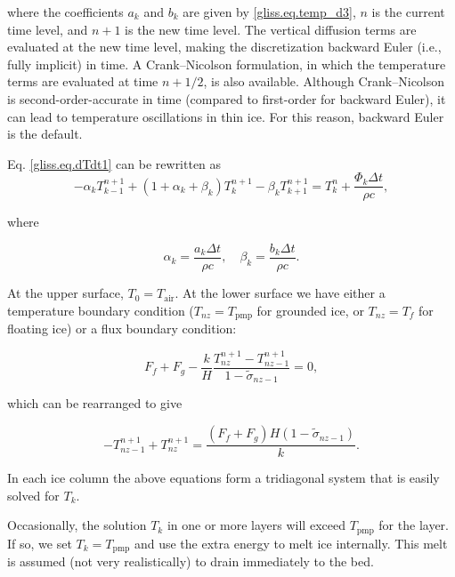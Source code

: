 \noindent
where the coefficients $a_k$ and $b_k$ are given by \eqref{gliss.eq.temp_d3}, $n$ is the current time level,
and $n+1$ is the new time level.  The vertical diffusion terms are evaluated at the new time level,
making the discretization backward Euler (i.e., fully implicit) in time.  A Crank--Nicolson formulation, in which the temperature
terms are evaluated at time $n+1/2$, is also available.  Although Crank--Nicolson is second-order-accurate
in time (compared to first-order for backward Euler), it can lead to temperature oscillations in thin ice.
For this reason, backward Euler is the default.

Eq. \eqref{gliss.eq.dTdt1} can be rewritten as
\begin{equation}
  \label{gliss.eq.dTdt2}
  -{{\alpha }_{k}}T_{k-1}^{n+1} + (1+{{\alpha }_{k}}+{{\beta }_{k}})T_{k}^{n+1} - {{\beta }_{k}}T_{k+1}^{n+1} =
  T_{k}^{n} + \frac{{{\Phi }_{k}}\Delta t}{\rho c},
\end{equation}

\noindent
where

\begin{equation}
   {{\alpha }_{k}}=\frac{{{a}_{k}}\Delta t}{\rho c}, \quad {{\beta }_{k}}=\frac{{{b}_{k}}\Delta t}{\rho c}.
\end{equation}

\noindent
At the upper surface, $T_0 = T_{\mathrm{air}}$.  At the lower surface we have either 
a temperature boundary condition ($T_{nz} = T_{\mathrm{pmp}}$ for grounded ice, or
$T_{nz} = T_f$ for floating ice) or a flux boundary condition:

\begin{equation}
  \label{gliss.eq.lower_flux_bc}
  {{F}_{f}}+{{F}_{g}}-\frac{k}{H}\frac{T_{nz}^{n+1}-T_{nz-1}^{n+1}}{1-{{{\tilde{\sigma }}}_{nz-1}}} = 0,
\end{equation}

\noindent
which can be rearranged to give

\begin{equation}
  \label{gliss.eq.lower_flux_bc2}
  -T_{nz-1}^{n+1}+T_{nz}^{n+1} = \frac{\left( {{F}_{f}}+{{F}_{g}} \right)H\left( 1-{{{\tilde{\sigma }}}_{nz-1}} \right)}{k}.
\end{equation}

\noindent
In each ice column the above equations form a tridiagonal system that is easily solved for $T_k$.

Occasionally, the solution $T_k$ in one or more layers will exceed $T_{\mathrm{pmp}}$ for the layer.
If so, we set $T_k = T_{\mathrm{pmp}}$ and use the extra energy to melt ice internally.
This melt is assumed (not very realistically) to drain immediately to the bed.

